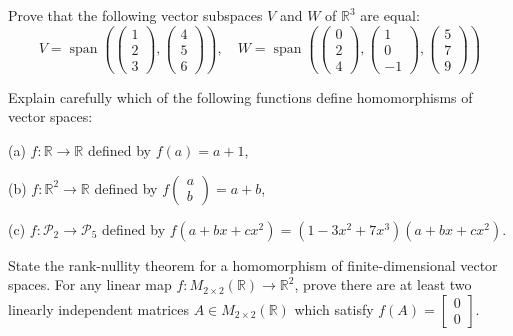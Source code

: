 \begin{question}{}{}
	Prove that the following vector subspaces $V$ and $W$ of $\mathbb{R}^{3}$ are equal:
	$$
	V=\operatorname{span}\left(\left(\begin{array}{l}
		1 \\
		2 \\
		3
	\end{array}\right),\left(\begin{array}{l}
		4 \\
		5 \\
		6
	\end{array}\right)\right), \quad W=\operatorname{span}\left(\left(\begin{array}{l}
		0 \\
		2 \\
		4
	\end{array}\right),\left(\begin{array}{r}
		1 \\
		0 \\
		-1
	\end{array}\right),\left(\begin{array}{l}
		5 \\
		7 \\
		9
	\end{array}\right)\right)
	$$
\end{question}
%
\begin{question}{}{}
	Explain carefully which of the following functions define homomorphisms of vector spaces:
	
	(a) $f: \mathbb{R} \rightarrow \mathbb{R}$ defined by $f(a)=a+1$,
	
	(b) $f: \mathbb{R}^{2} \rightarrow \mathbb{R}$ defined by $f\begin{pmatrix}a \\ b\end{pmatrix}=a+b$,
	
	(c) $f: \mathcal{P}_{2} \rightarrow \mathcal{P}_{5}$ defined by $f\left(a+b x+c x^{2}\right)=\left(1-3 x^{2}+7 x^{3}\right)\left(a+b x+c x^{2}\right)$.
\end{question}
%
\begin{question}{}{}
	State the rank-nullity theorem for a homomorphism of finite-dimensional vector spaces.
	For any linear map $f: M_{2 \times 2}(\mathbb{R}) \rightarrow \mathbb{R}^{2}$, prove there are at least two linearly independent matrices $A \in M_{2 \times 2}(\mathbb{R})$ which satisfy $f(A)=\begin{bmatrix}
		0\\
		0
	\end{bmatrix}$.
\end{question}
